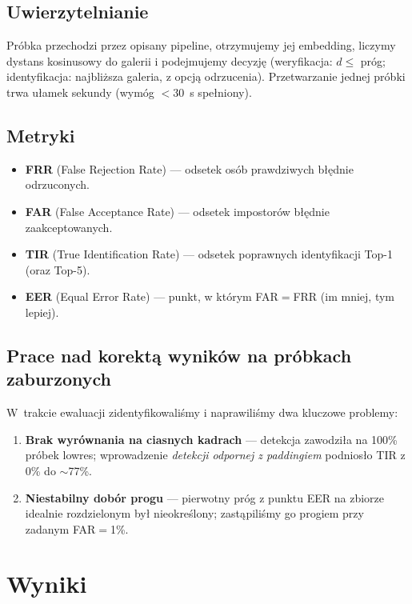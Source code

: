 \documentclass[11pt,a4paper]{article}
\begin{document}
\subsection{Uwierzytelnianie}
Próbka przechodzi przez opisany pipeline, otrzymujemy jej embedding, liczymy dystans
kosinusowy do galerii i podejmujemy decyzję (weryfikacja: $d\le$ próg; identyfikacja:
najbliższa galeria, z opcją odrzucenia). Przetwarzanie jednej próbki trwa ułamek sekundy
(wymóg $<30$~s spełniony).

\subsection{Metryki}
\begin{itemize}[nosep]
\item \textbf{FRR} (False Rejection Rate) --- odsetek osób prawdziwych błędnie odrzuconych.
\item \textbf{FAR} (False Acceptance Rate) --- odsetek impostorów błędnie zaakceptowanych.
\item \textbf{TIR} (True Identification Rate) --- odsetek poprawnych identyfikacji Top-1
(oraz Top-5).
\item \textbf{EER} (Equal Error Rate) --- punkt, w którym FAR${=}$FRR (im mniej, tym lepiej).
\end{itemize}

\subsection{Prace nad korektą wyników na próbkach zaburzonych}
W~trakcie ewaluacji zidentyfikowaliśmy i naprawiliśmy dwa kluczowe problemy:
\begin{enumerate}[nosep]
\item \textbf{Brak wyrównania na ciasnych kadrach} --- detekcja zawodziła na 100\% próbek
lowres; wprowadzenie \emph{detekcji odpornej z paddingiem} podniosło TIR z 0\% do $\sim$77\%.
\item \textbf{Niestabilny dobór progu} --- pierwotny próg z punktu EER na zbiorze idealnie
rozdzielonym był nieokreślony; zastąpiliśmy go progiem przy zadanym FAR${=}$1\%.
\end{enumerate}

\section{Wyniki}
\end{document}

